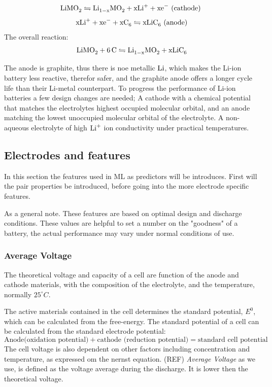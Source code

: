 $$\ce{LiMO_2} \leftrightharpoons   \ce{Li_{1-x}MO_2} + \ce{xLi^+} + \ce {xe^-}\text{ (cathode)} $$
$$\ce{xLi+} + \ce{xe^-} + \ce{xC_6} \leftrightharpoons  \ce{xLiC_6} \text{ (anode)} $$
The overall reaction:
$$\ce{LiMO_2} + \ce{6C} \leftrightharpoons  \ce{Li_{1-x}MO_2} +  \ce{xLiC_6}$$

The anode is graphite, thus there is noe metallic $\ce{Li}$, which makes the Li-ion battery less reactive, therefor safer, and the graphite anode offers a longer cycle life than their Li-metal counterpart. To progress the performance of Li-ion batteries a few design changes are needed; A cathode with a chemical potential that matches the electrolytes highest occupied molecular orbital, and an anode matching the lowest unoccupied molecular orbital of the electrolyte. A non-aqueous electrolyte of high $\ce{Li^+} $ ion conductivity under practical temperatures. 


\subsection{Electrodes and features}
	In this section the features used in ML as predictors will be introduces. First will the pair properties be introduced, before going into the more electrode specific features. 

	As a general note. These features are based on optimal design and discharge conditions. These values are helpful to set a number on the "goodness" of a battery, the actual performance may vary under normal conditions of use. 

	
	\subsubsection*{Average Voltage}
	The theoretical voltage and capacity of a cell are function of the anode and cathode materials, with the composition of the electrolyte, and the temperature, normally $25^\circ\si{C}$.
	
	The active materials contained in the cell determines the standard potential, $E^0$, which can be calculated from the free-energy. 
	The standard potential of a cell can be calculated from the standard electrode potential:
	\begin{equation}
	\text{Anode(oxidation potential)} + \text{cathode (reduction potential)} = \text{standard cell potential}
	\end{equation}  
	The cell voltage is also dependent on other factors including concentration and temperature, as expressed om the nernst equation. (REF)
	\textit{Average Voltage} as we use, is defined as the voltage average during the discharge. It is lower then the theoretical voltage.

